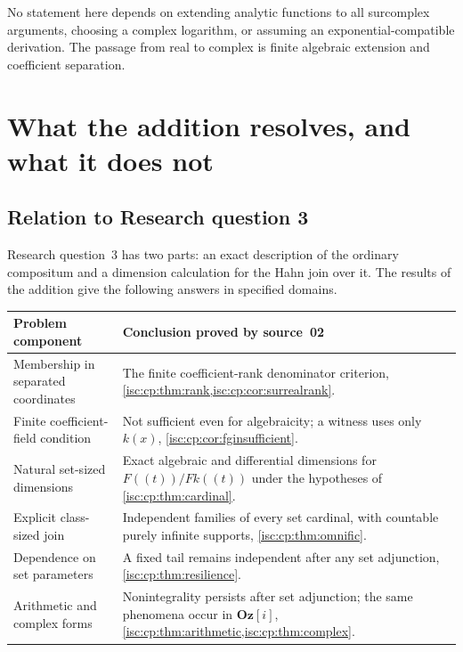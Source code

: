 \documentclass[11pt,letterpaper]{article}
\theoremstyle{definition}
\theoremstyle{remark}
\newcommand{\Oz}{\mathbf{Oz}}
\numberwithin{equation}{section}
\begin{document}
No statement here depends on extending analytic functions to all
surcomplex arguments, choosing a complex logarithm, or assuming an
exponential-compatible derivation. The passage from real to complex is
finite algebraic extension and coefficient separation.

\section{What the addition resolves, and what it does not}\label{isc:cp:sec:audit}

\subsection{Relation to Research question 3}

Research question~3 has two parts: an exact description of the ordinary
compositum and a dimension calculation for the Hahn join over it. The
results of the addition give the following answers in specified domains.

\begin{center}\small
\begin{tabular}{@{}p{}p{}@{}}
\toprule
Problem component & Conclusion proved by source~02 \\
\midrule
Membership in separated coordinates & The finite coefficient-rank
denominator criterion, \cref{isc:cp:thm:rank,isc:cp:cor:surrealrank}. \\
Finite coefficient-field condition & Not sufficient even for algebraicity;
a witness uses only $k(x)$, \cref{isc:cp:cor:fginsufficient}. \\
Natural set-sized dimensions & Exact algebraic and differential dimensions
for $F((t))/F k((t))$ under the hypotheses of \cref{isc:cp:thm:cardinal}. \\
Explicit class-sized join & Independent families of every set cardinal,
with countable purely infinite supports, \cref{isc:cp:thm:omnific}. \\
Dependence on set parameters & A fixed tail remains independent after any
set adjunction, \cref{isc:cp:thm:resilience}. \\
Arithmetic and complex forms & Nonintegrality persists after set
adjunction; the same phenomena occur in $\Oz[i]$,
\cref{isc:cp:thm:arithmetic,isc:cp:thm:complex}. \\
\bottomrule
\end{tabular}
\end{center}
\end{document}
